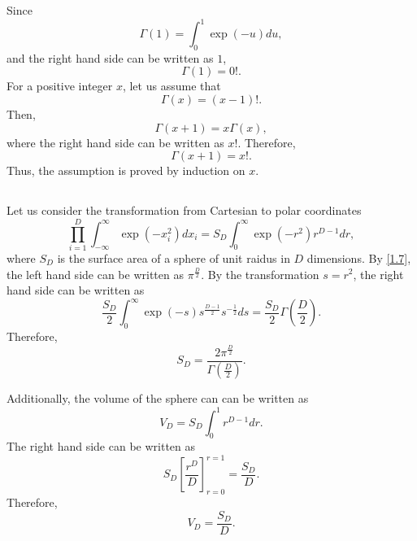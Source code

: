 Since
%
\begin{equation}
\Gamma(1) 
= 
\int_{0}^{1} 
\exp(- u) 
du,
\end{equation}
%
and the right hand side can be written as $1$,
%
\begin{equation}
\Gamma(1) 
= 
0!.
\end{equation}
%
For a positive integer $x$, let us assume that
%
\begin{equation}
\Gamma(x) 
=
 (x - 1)!.
\end{equation}
%
Then,
%
\begin{equation}
\Gamma(x + 1) 
= 
x 
\Gamma(x),
\end{equation}
%
where the right hand side can be written as $x!$.
Therefore,
%
\begin{equation}
\Gamma(x + 1) = x!.
\end{equation}
%
Thus, the assumption is proved by induction on $x$.


\subsection{}
\label{1.18}
Let us consider the transformation from Cartesian to polar coordinates
%
\begin{equation}
\prod_{i = 1}^{D} 
\int_{- \infty}^{\infty} 
\exp 
\left( 
	- x_i ^ 2 
\right) 
dx_i 
= 
S_D 
\int_{0}^{\infty} 
\exp 
\left( 
	- r ^ 2 
\right) 
r ^ {D - 1} 
dr,
\end{equation}
%
where $S_D$ is the surface area of a sphere of unit raidus in $D$ dimensions. 
By \ref{1.7}, the left hand side can be written as $\pi ^ \frac{D}{2}$. By the transformation $s = r ^ 2$, the right hand side can be written as
%
\begin{equation}
\frac{S_D}{2} 
\int_{0}^{\infty} 
\exp(- s) 
s ^ \frac{D - 1}{2} 
s ^ {- \frac{1}{2}} 
ds 
= 
\frac{S_D}{2} 
\Gamma 
\left( 
	\frac{D}{2} 
\right).
\end{equation}
%
Therefore,
%
\begin{equation}
S_D 
= 
\frac{2 \pi ^ \frac{D}{2}}
{\Gamma 
\left( 
	\frac{D}{2} 
\right)}.
\end{equation}
%

Additionally, the volume of the sphere can can be written as
%
\begin{equation}
V_D 
= 
S_D 
\int_{0}^{1} 
r^{D - 1} 
dr.
\end{equation}
%
The right hand side can be written as 
%
\begin{equation}
S_D 
\left[ 
	\frac{r ^ D}{D} 
\right]_{r = 0}^{r = 1} 
= 
\frac{S_D}{D}.
\end{equation}
%
Therefore, 
%
\begin{equation}
V_D 
= 
\frac{S_D}{D}.
\end{equation}
%

